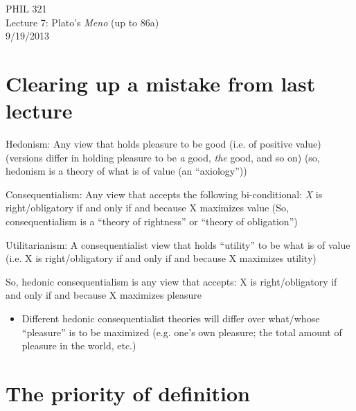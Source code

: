 \documentclass[11pt]{article}
\begin{document}
\thispagestyle{empty}
\begin{center} \LARGE{PHIL 321\\ Lecture 7: Plato's \emph{Meno} (up to 86a)}\\ \vspace*{2mm}
\large{9/19/2013}\end{center}
\thispagestyle{empty}\vspace*{3mm}

\vspace*{-8mm}
\section*{Clearing up a mistake from last lecture}

\noindent Hedonism: Any view that holds pleasure to be good (i.e. of positive value) (versions differ in holding pleasure to be \emph{a} good, \emph{the} good, and so on) (so, hedonism is a theory of what is of value (an ``axiology''))
\vspace*{2mm} 

\noindent Consequentialism: Any view that accepts the following bi-conditional: \emph{X} is right/obligatory if and only if and because X maximizes value (So, consequentialism is a ``theory of rightness'' or ``theory of obligation'')
\vspace*{2mm}

\noindent Utilitarianism: A consequentialist view that holds ``utility'' to be what is of value (i.e. X is right/obligatory if and only if and because X maximizes utility)
\vspace*{2mm}

\noindent So, hedonic consequentialism is any view that accepts: X is right/obligatory if and only if and because X maximizes pleasure

\begin{itemize}\item{Different hedonic consequentialist theories will differ over what/whose ``pleasure'' is to be maximized (e.g. one's own pleasure; the total amount of pleasure in the world, etc.)}\end{itemize}\section*{The priority of definition}
\end{document}
